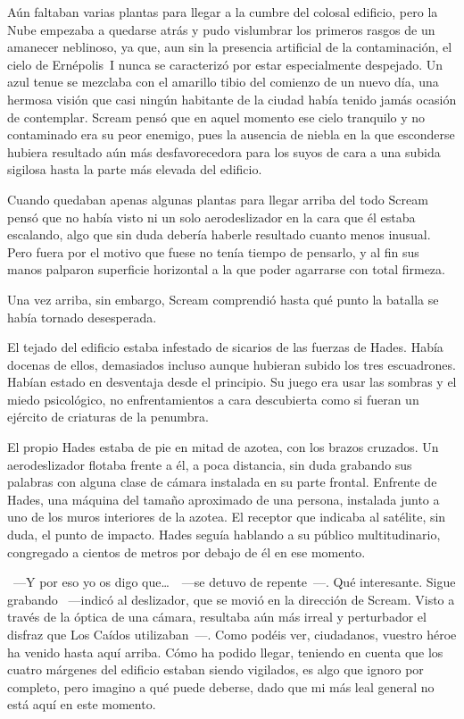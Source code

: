 Aún faltaban varias plantas para llegar a la cumbre del colosal edificio, pero la Nube empezaba a quedarse atrás y pudo vislumbrar los primeros rasgos de un amanecer neblinoso, ya que, aun sin la presencia artificial de la contaminación, el cielo de Ernépolis~I nunca se caracterizó por estar especialmente despejado. Un azul tenue se mezclaba con el amarillo tibio del comienzo de un nuevo día, una hermosa visión que casi ningún habitante de la ciudad había tenido jamás ocasión de contemplar. Scream pensó que en aquel momento ese cielo tranquilo y no contaminado era su peor enemigo, pues la ausencia de niebla en la que esconderse hubiera resultado aún más desfavorecedora para los suyos de cara a una subida sigilosa hasta la parte más elevada del edificio.

Cuando quedaban apenas algunas plantas para llegar arriba del todo Scream pensó que no había visto ni un solo aerodeslizador en la cara que él estaba escalando, algo que sin duda debería haberle resultado cuanto menos inusual. Pero fuera por el motivo que fuese no tenía tiempo de pensarlo, y al fin sus manos palparon superficie horizontal a la que poder agarrarse con total firmeza.

Una vez arriba, sin embargo, Scream comprendió hasta qué punto la batalla se había tornado desesperada.

El tejado del edificio estaba infestado de sicarios de las fuerzas de Hades. Había docenas de ellos, demasiados incluso aunque hubieran subido los tres escuadrones. Habían estado en desventaja desde el principio. Su juego era usar las sombras y el miedo psicológico, no enfrentamientos a cara descubierta como si fueran un ejército de criaturas de la penumbra.

El propio Hades estaba de pie en mitad de azotea, con los brazos cruzados. Un aerodeslizador flotaba frente a él, a poca distancia, sin duda grabando sus palabras con alguna clase de cámara instalada en su parte frontal. Enfrente de Hades, una máquina del tamaño aproximado de una persona, instalada junto a uno de los muros interiores de la azotea. El receptor que indicaba al satélite, sin duda, el punto de impacto. Hades seguía hablando a su público multitudinario, congregado a cientos de metros por debajo de él en ese momento.

~---Y por eso yo os digo que\dots\ ~---se detuvo de repente~---. Qué interesante. Sigue grabando ~---indicó al deslizador, que se movió en la dirección de Scream. Visto a través de la óptica de una cámara, resultaba aún más irreal y perturbador el disfraz que Los Caídos utilizaban~---. Como podéis ver, ciudadanos, vuestro héroe ha venido hasta aquí arriba. Cómo ha podido llegar, teniendo en cuenta que los cuatro márgenes del edificio estaban siendo vigilados, es algo que ignoro por completo, pero imagino a qué puede deberse, dado que mi más leal general no está aquí en este momento.

